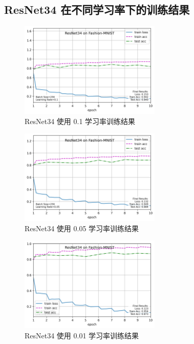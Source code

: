 \documentclass[UTF8]{ctexart}
\begin{document}
\newpage
\subsection{ResNet34 在不同学习率下的训练结果}
\begin{center}
\begin{minipage}{\textwidth}
\begin{figure}[H]
    \centering
    \includegraphics[width=0.6\textwidth]{picture/resnet34_on_fashion-mnist_bs256_lr0.1_20241110_221450.png}
    \caption{ResNet34 使用 0.1 学习率训练结果}
\end{figure}
\vfill

\begin{figure}[H]
    \centering
    \includegraphics[width=0.6\textwidth]{picture/resnet34_on_fashion-mnist_bs256_lr0.05_20241110_222110.png}
    \caption{ResNet34 使用 0.05 学习率训练结果}
\end{figure}
\vfill

\begin{figure}[H]
    \centering
    \includegraphics[width=0.6\textwidth]{picture/resnet34_on_fashion-mnist_bs256_lr0.01_20241110_222753.png}
    \caption{ResNet34 使用 0.01 学习率训练结果}
\end{figure}
\end{minipage}
\end{center}
\end{document}
